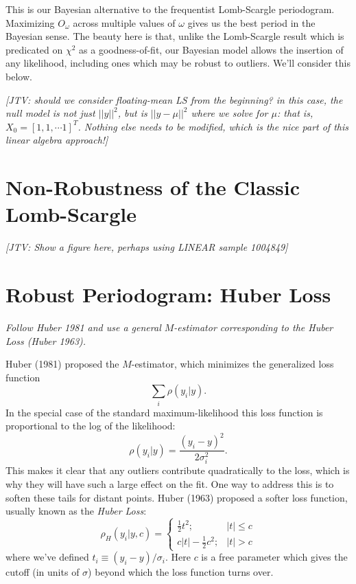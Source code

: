\documentclass[12pt,pdftex]{article}
\newcommand{\jake}[1]{{\color{blue}\it[JTV: #1]}}
\begin{document}
This is our Bayesian alternative to the frequentist Lomb-Scargle periodogram.
Maximizing $O_\omega$ across multiple values of $\omega$ gives us the best period in the Bayesian sense.
The beauty here is that, unlike the Lomb-Scargle result which is predicated on $\chi^2$ as a goodness-of-fit, our Bayesian model allows the insertion of any likelihood, including ones which may be robust to outliers. We'll consider this below.

\jake{should we consider floating-mean LS from the beginning? in this case, the null model is not just $||y||^2$, but is $||y - \mu||^2$ where we solve for $\mu$: that is, $X_0 = [1, 1, \cdots 1]^T$. Nothing else needs to be modified, which is the nice part of this linear algebra approach!}

\section{Non-Robustness of the Classic Lomb-Scargle}

\jake{Show a figure here, perhaps using LINEAR sample 1004849}

\section{Robust Periodogram: Huber Loss}
{\it Follow Huber 1981 and use a general $M$-estimator corresponding to the Huber Loss (Huber 1963).}

Huber (1981) proposed the $M$-estimator, which minimizes the generalized loss function
\begin{equation}
  \sum_i \rho(y_i|y).
\end{equation}
In the special case of the standard maximum-likelihood this loss function is proportional to the log of the likelihood:
\begin{equation}
  \rho(y_i|y) = \frac{(y_i - y)^2}{2\sigma_i^2}.
\end{equation}
This makes it clear that any outliers contribute quadratically to the loss, which is why they will have such a large effect on the fit.
One way to address this is to soften these tails for distant points. Huber (1963) proposed a softer loss function, usually known as the {\it Huber Loss}:
\begin{equation}
  \rho_H(y_i|y,c) = \left\{
  \begin{array}{ll}
    \frac{1}{2}t^2; & |t| \le c \\
    c|t| - \frac{1}{2}c^2; & |t| > c
  \end{array}
  \right.
\end{equation}
where we've defined $t_i \equiv (y_i - y) / \sigma_i$. Here $c$ is a free parameter which gives the cutoff (in units of $\sigma$) beyond which the loss function turns over.
\end{document}
